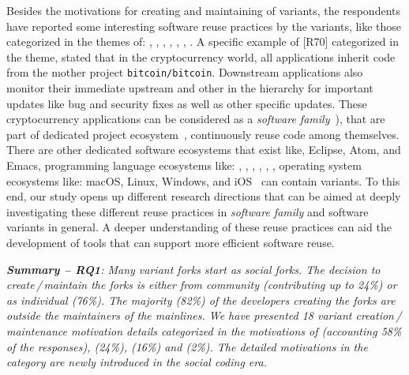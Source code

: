 Besides the motivations for creating and maintaining of variants, the respondents have reported some interesting software reuse practices by the variants, like those categorized in the themes of: , , , , , , . A specific example of [R70] categorized in the  theme, stated that in the cryptocurrency world, all applications inherit code from the mother project \texttt{bitcoin/bitcoin}. Downstream applications also monitor their immediate upstream and other in the hierarchy for important updates like bug and security fixes as well as other specific updates. These cryptocurrency applications can be considered as a \textit{software family}~\cite{businge:2018icsme,businge:emse:2021}), that are part of dedicated project ecosystem~\cite{tommens:2020}, continuously reuse code among themselves.
There are other dedicated software ecosystems that exist like, \textsf{Eclipse}, \textsf{Atom}, and \textsf{Emacs}, programming language ecosystems like:  \java, \cp, \cpp, \py, \go, \rb, operating system ecosystems like: \textsf{macOS}, \textsf{Linux}, \textsf{Windows}, and \textsf{iOS}~\cite{tommens:2020} can contain variants.
To this end, our study opens up different research directions that can be aimed at deeply investigating these different reuse practices in \textit{software family} and software variants in general. A deeper understanding of these reuse practices can aid the development of tools that can support more efficient software reuse.

\begin{framed}
\noindent
\emph{\textbf{Summary -- RQ1}:
Many variant forks start as social forks. The decision to create\,/\,maintain the forks is either from community (contributing up to 24\%) or as individual (76\%). The majority (82\%) of the developers creating the forks are outside the maintainers of the mainlines. We have presented 18 variant creation\,/\,maintenance motivation details categorized in the motivations of  (accounting 58\% of the responses),  (24\%),  (16\%) and  (2\%). The detailed motivations in the  category are newly introduced in the social coding era. 
}
\end{framed}


